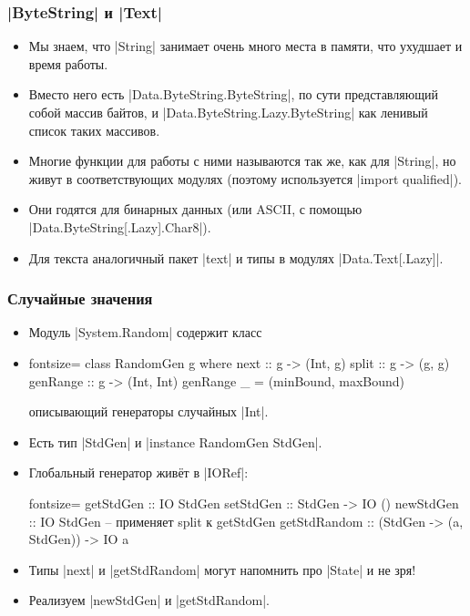 \documentclass[11pt]{beamer}
\begin{document}
\begin{frame}[fragile]
  \frametitle{\haskinline|ByteString| и \haskinline|Text|}
  \begin{itemize}
    \item Мы знаем, что \haskinline|String| занимает очень много места в памяти, что ухудшает и время работы.
    \item Вместо него есть \haskinline|Data.ByteString.ByteString|, по сути представляющий собой массив байтов, и \haskinline|Data.ByteString.Lazy.ByteString| как ленивый список таких массивов.
    \item Многие функции для работы с ними называются так же, как для \haskinline|String|, но живут в соответствующих модулях (поэтому используется \haskinline|import qualified|).
    \item Они годятся для бинарных данных (или ASCII, с помощью \haskinline|Data.ByteString[.Lazy].Char8|).
    \item Для текста аналогичный пакет \haskinline|text| и типы в модулях \haskinline|Data.Text[.Lazy]|.
  \end{itemize}
\end{frame}

\begin{frame}[fragile]
  \frametitle{Случайные значения}
  \begin{itemize}
    \item Модуль \haskinline|System.Random| содержит класс
    \item
          \begin{haskell*}{fontsize=\footnotesize}
            class RandomGen g where
            next :: g -> (Int, g)
            split :: g -> (g, g)
            genRange :: g -> (Int, Int)
            genRange _ = (minBound, maxBound)
          \end{haskell*}
          описывающий генераторы случайных \haskinline|Int|.
    \item Есть тип \haskinline|StdGen| и \haskinline|instance RandomGen StdGen|.
    \item Глобальный генератор живёт в \haskinline|IORef|:
          \begin{haskell*}{fontsize=\footnotesize}
            getStdGen :: IO StdGen
            setStdGen :: StdGen -> IO ()
            newStdGen :: IO StdGen  -- применяет split к getStdGen
            getStdRandom :: (StdGen -> (a, StdGen)) -> IO a
          \end{haskell*}
    \item Типы \haskinline|next| и \haskinline|getStdRandom| могут напомнить про \haskinline|State| и не зря!
    \item Реализуем \haskinline|newStdGen| и \haskinline|getStdRandom|.
  \end{itemize}
\end{frame}
\end{document}
